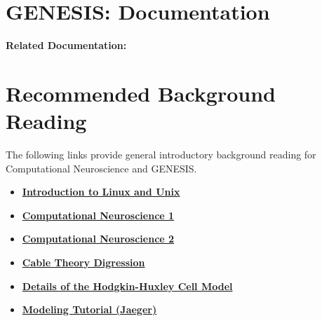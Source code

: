 \documentclass[12pt]{article}
\begin{document}
\section*{GENESIS: Documentation}

{\bf Related Documentation:}

\section*{Recommended Background Reading}

The following links provide general introductory background reading for Computational Neuroscience and GENESIS.

\begin{itemize}
\item \href{../unix-linux/unix-linux.tex}{\bf Introduction to Linux and Unix}
\item \href{../compneurosci1/compneurosci1.tex}{\bf Computational Neuroscience 1}
\item \href{../compneurosci2/compneurosci2.tex}{\bf Computational Neuroscience 2}
\item \href{../cable-theory-digression/cable-theory-digression.tex}{\bf Cable Theory Digression}
\item \href{../hh-model-details/hh-model-details.tex}{\bf Details of the Hodgkin-Huxley Cell Model}
\item \href{../tutorial-jaeger/tutorial-jaeger.pdf}{\bf Modeling Tutorial (Jaeger)}
\end{itemize}
\end{document}
